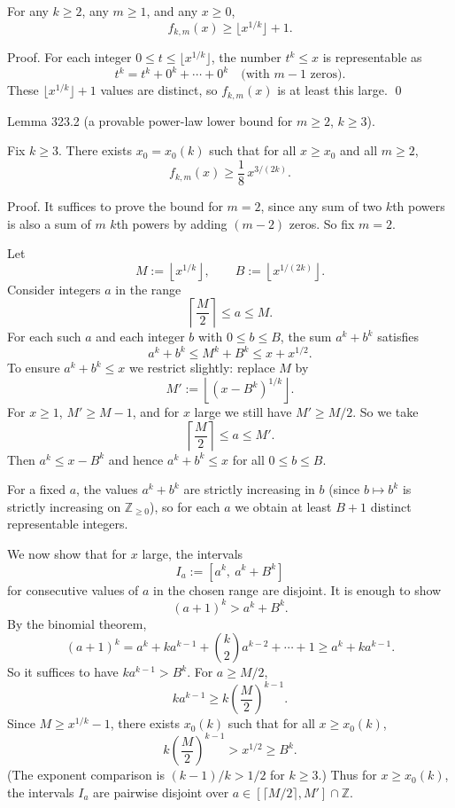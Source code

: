 For any $k\ge 2$, any $m\ge 1$, and any $x\ge 0$,
\[
f_{k,m}(x)\ge \bigl\lfloor x^{1/k}\bigr\rfloor+1.
\]

Proof.
For each integer $0\le t\le \lfloor x^{1/k}\rfloor$, the number $t^k\le x$ is representable as
\[
t^k = t^k + 0^k+\cdots+0^k\quad\text{(with $m-1$ zeros)}.
\]
These $\lfloor x^{1/k}\rfloor+1$ values are distinct, so $f_{k,m}(x)$ is at least this large. \qed


Lemma 323.2 (a provable power-law lower bound for $m\ge 2$, $k\ge 3$).

Fix $k\ge 3$. There exists $x_0=x_0(k)$ such that for all $x\ge x_0$ and all $m\ge 2$,
\[
f_{k,m}(x)\ge \frac{1}{8}\,x^{3/(2k)}.
\]

Proof.
It suffices to prove the bound for $m=2$, since any sum of two $k$th powers is also a sum of $m$ $k$th powers by adding $(m-2)$ zeros.
So fix $m=2$.

Let
\[
M:=\left\lfloor x^{1/k}\right\rfloor,\qquad B:=\left\lfloor x^{1/(2k)}\right\rfloor.
\]
Consider integers $a$ in the range
\[
\left\lceil \frac{M}{2}\right\rceil\le a\le M.
\]
For each such $a$ and each integer $b$ with $0\le b\le B$, the sum $a^k+b^k$ satisfies
\[
a^k+b^k\le M^k+B^k\le x + x^{1/2}.
\]
To ensure $a^k+b^k\le x$ we restrict slightly: replace $M$ by
\[
M':=\left\lfloor (x-B^k)^{1/k}\right\rfloor.
\]
For $x\ge 1$, $M'\ge M-1$, and for $x$ large we still have $M'\ge M/2$.
So we take
\[
\left\lceil \frac{M}{2}\right\rceil\le a\le M'.
\]
Then $a^k\le x-B^k$ and hence $a^k+b^k\le x$ for all $0\le b\le B$.

For a fixed $a$, the values $a^k+b^k$ are strictly increasing in $b$ (since $b\mapsto b^k$ is strictly increasing on $\mathbb Z_{\ge 0}$), so for each $a$ we obtain at least $B+1$ distinct representable integers.

We now show that for $x$ large, the intervals
\[
I_a:=[a^k,\ a^k+B^k]
\]
for consecutive values of $a$ in the chosen range are disjoint. It is enough to show
\[
(a+1)^k > a^k + B^k.
\]
By the binomial theorem,
\[
(a+1)^k = a^k + k a^{k-1} + \binom{k}{2}a^{k-2}+\cdots+1 \ge a^k + k a^{k-1}.
\]
So it suffices to have $k a^{k-1} > B^k$.
For $a\ge M/2$,
\[
ka^{k-1} \ge k\left(\frac{M}{2}\right)^{k-1}.
\]
Since $M\ge x^{1/k}-1$, there exists $x_0(k)$ such that for all $x\ge x_0(k)$,
\[
k\left(\frac{M}{2}\right)^{k-1} > x^{1/2} \ge B^k.
\]
(The exponent comparison is $(k-1)/k>1/2$ for $k\ge 3$.)
Thus for $x\ge x_0(k)$, the intervals $I_a$ are pairwise disjoint over $a\in[\lceil M/2\rceil, M']\cap\mathbb Z$.

